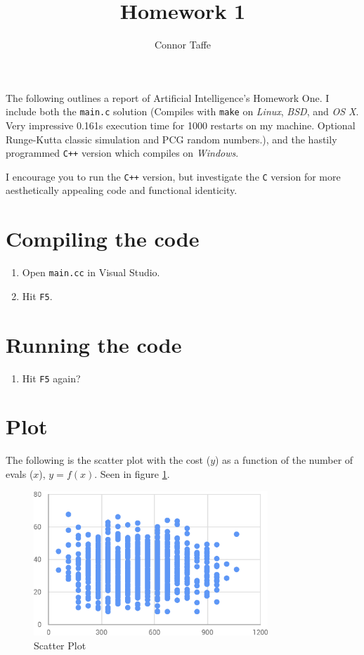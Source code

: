 \documentclass{article}
\title{Homework 1}
\author{Connor Taffe}
\begin{document}
	\maketitle

	The following outlines a report of Artificial Intelligence's Homework One. I include both the {\tt main.c} solution (Compiles with {\tt make} on {\it Linux}, {\it BSD}, and {\it OS X}. Very impressive 0.161s execution time for 1000 restarts on my machine. Optional Runge-Kutta classic simulation and PCG random numbers.), and the hastily programmed {\tt C++} version which compiles on {\it Windows}.

	I encourage you to run the {\tt C++} version, but investigate the {\tt C} version for more aesthetically appealing code and functional identicity.

	\section{Compiling the code}

	\begin{enumerate}
		\item{Open {\tt main.cc} in Visual Studio.}
		\item{Hit {\tt F5}.}
	\end{enumerate}

	\section{Running the code}
		\begin{enumerate}
			\item{Hit {\tt F5} again?}
		\end{enumerate}

	\section{Plot}

	The following is the scatter plot with the cost ($y$) as a function of the number of evals ($x$), $y = f(x)$. Seen in figure \ref{plot}.

	\begin{figure}[h]
		\centering
		\includegraphics[width=250pt]{plot}
		\caption{\label{plot} Scatter Plot}
	\end{figure}
\end{document}
